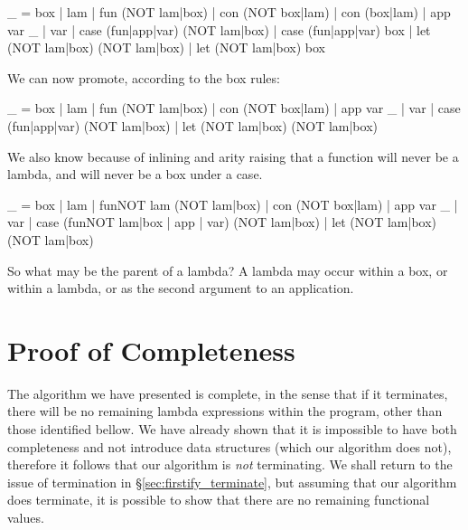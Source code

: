 \documentclass[preprint]{sigplanconf}
\begin{document}
\begin{code}
_ = box | lam | fun (NOT lam|box) | con (NOT box|lam) | con (box|lam) | app var  _ | var | case (fun|app|var) (NOT lam|box) | case (fun|app|var) box | let (NOT lam|box) (NOT lam|box) | let (NOT lam|box) box
\end{code}

We can now promote, according to the box rules:

\begin{code}
_ = box | lam | fun (NOT lam|box) | con (NOT box|lam) | app var  _ | var | case (fun|app|var) (NOT lam|box) | let (NOT lam|box) (NOT lam|box)
\end{code}

We also know because of inlining and arity raising that a function will never be a lambda, and will never be a box under a case.

\begin{code}
_ = box | lam | fun{NOT lam} (NOT lam|box) | con (NOT box|lam) | app var  _ | var | case (fun{NOT lam|box} | app | var) (NOT lam|box) | let (NOT lam|box) (NOT lam|box)
\end{code}

So what may be the parent of a lambda? A lambda may occur within a box, or within a lambda, or as the second argument to an application.








\section{Proof of Completeness}


The algorithm we have presented is complete, in the sense that if it terminates, there will be no remaining lambda expressions within the program, other than those identified bellow. We have already shown that it is impossible to have both completeness and not introduce data structures (which our algorithm does not), therefore it follows that our algorithm is \textit{not} terminating. We shall return to the issue of termination in \S\ref{sec:firstify_terminate}, but assuming that our algorithm does terminate, it is possible to show that there are no remaining functional values.
\end{document}
